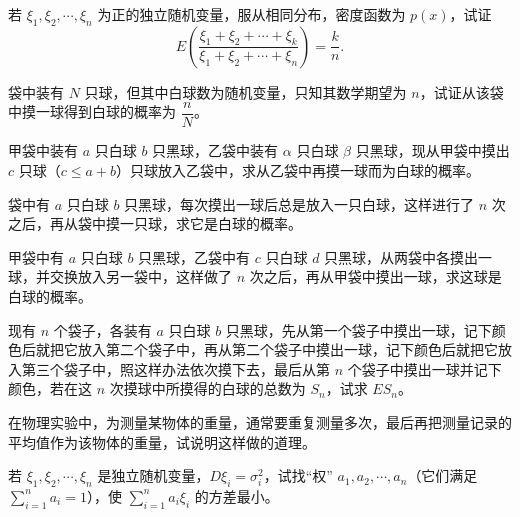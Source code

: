 \documentclass[../../main.tex]{subfiles}
\begin{document}
\begin{exercise}\label{exercise:ch04-15}
若 $\xi_1,\xi_2,\cdots,\xi_n$ 为正的独立随机变量，服从相同分布，密度函数为 $p(x)$，试证
\[
E\left(\frac{\xi_1+\xi_2+\cdots+\xi_k}{\xi_1+\xi_2+\cdots+\xi_n}\right)=\frac{k}{n}.
\]
\end{exercise}

\begin{exercise}\label{exercise:ch04-16}
袋中装有 $N$ 只球，但其中白球数为随机变量，只知其数学期望为 $n$，试证从该袋中摸一球得到白球的概率为 $\dfrac{n}{N}$。
\end{exercise}

\begin{exercise}\label{exercise:ch04-17}
甲袋中装有 $a$ 只白球 $b$ 只黑球，乙袋中装有 $\alpha$ 只白球 $\beta$ 只黑球，现从甲袋中摸出 $c$ 只球（$c\leqslant a+b$）只球放入乙袋中，求从乙袋中再摸一球而为白球的概率。
\end{exercise}

\begin{exercise}\label{exercise:ch04-18}
袋中有 $a$ 只白球 $b$ 只黑球，每次摸出一球后总是放入一只白球，这样进行了 $n$ 次之后，再从袋中摸一只球，求它是白球的概率。
\end{exercise}

\begin{exercise}\label{exercise:ch04-19}
甲袋中有 $a$ 只白球 $b$ 只黑球，乙袋中有 $c$ 只白球 $d$ 只黑球，从两袋中各摸出一球，并交换放入另一袋中，这样做了 $n$ 次之后，再从甲袋中摸出一球，求这球是白球的概率。
\end{exercise}

\begin{exercise}\label{exercise:ch04-20}
现有 $n$ 个袋子，各装有 $a$ 只白球 $b$ 只黑球，先从第一个袋子中摸出一球，记下颜色后就把它放入第二个袋子中，再从第二个袋子中摸出一球，记下颜色后就把它放入第三个袋子中，照这样办法依次摸下去，最后从第 $n$ 个袋子中摸出一球并记下颜色，若在这 $n$ 次摸球中所摸得的白球的总数为 $S_n$，试求 $ES_n$。
\end{exercise}

\begin{exercise}\label{exercise:ch04-21}
在物理实验中，为测量某物体的重量，通常要重复测量多次，最后再把测量记录的平均值作为该物体的重量，试说明这样做的道理。
\end{exercise}

\begin{exercise}\label{exercise:ch04-22}
若 $\xi_1,\xi_2,\cdots,\xi_n$ 是独立随机变量，$D\xi_i=\sigma_i^2$，试找“权” $a_1,a_2,\cdots,a_n$（它们满足 $\sum_{i=1}^n a_i=1$），使 $\sum_{i=1}^n a_i\xi_i$ 的方差最小。
\end{exercise}
\end{document}
